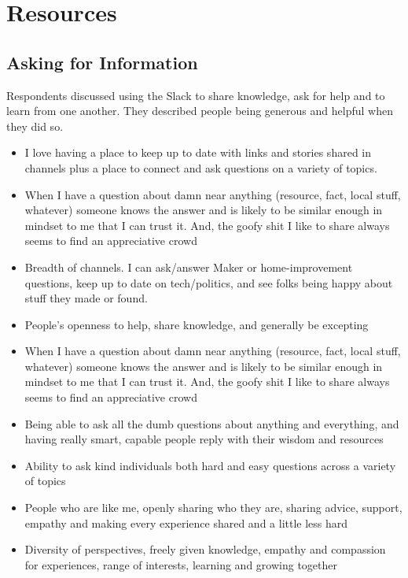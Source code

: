 \documentclass[
]{book}
\providecommand{\tightlist}{%
  \setlength{\itemsep}{0pt}\setlength{\parskip}{0pt}}
\begin{document}
\section{Resources}\label{resources}

\subsection{Asking for Information}\label{asking-for-information}

Respondents discussed using the Slack to share knowledge, ask for help and to learn from one another. They described people being generous and helpful when they did so.

\begin{itemize}
\tightlist
\item
  I love having a place to keep up to date with links and stories shared in channels plus a place to connect and ask questions on a variety of topics.
\item
  When I have a question about damn near anything (resource, fact, local stuff, whatever) someone knows the answer and is likely to be similar enough in mindset to me that I can trust it. And, the goofy shit I like to share always seems to find an appreciative crowd
\item
  Breadth of channels. I can ask/answer Maker or home-improvement questions, keep up to date on tech/politics, and see folks being happy about stuff they made or found.
\item
  People's openness to help, share knowledge, and generally be excepting
\item
  When I have a question about damn near anything (resource, fact, local stuff, whatever) someone knows the answer and is likely to be similar enough in mindset to me that I can trust it. And, the goofy shit I like to share always seems to find an appreciative crowd
\item
  Being able to ask all the dumb questions about anything and everything, and having really smart, capable people reply with their wisdom and resources
\item
  Ability to ask kind individuals both hard and easy questions across a variety of topics
\item
  People who are like me, openly sharing who they are, sharing advice, support, empathy and making every experience shared and a little less hard
\item
  Diversity of perspectives, freely given knowledge, empathy and compassion for experiences, range of interests, learning and growing together

\end{itemize}
\end{document}
